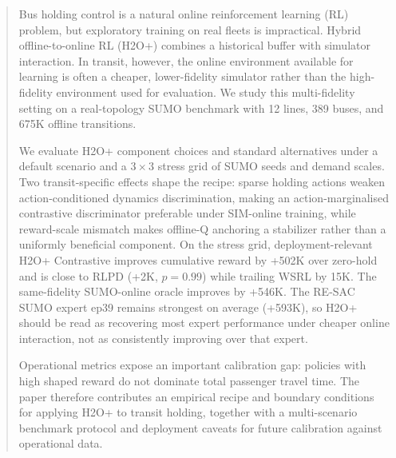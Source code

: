 \begin{abstract}
Bus holding control is a natural online reinforcement learning (RL) problem, but exploratory training on real fleets is impractical.
Hybrid offline-to-online RL (H2O+) combines a historical buffer with simulator interaction.
In transit, however, the online environment available for learning is often a cheaper, lower-fidelity simulator rather than the high-fidelity environment used for evaluation.
We study this multi-fidelity setting on a real-topology SUMO benchmark with 12 lines, 389 buses, and 675K offline transitions.

We evaluate H2O+ component choices and standard alternatives under a default scenario and a $3 \times 3$ stress grid of SUMO seeds and demand scales.
Two transit-specific effects shape the recipe: sparse holding actions weaken action-conditioned dynamics discrimination, making an action-marginalised contrastive discriminator preferable under SIM-online training, while reward-scale mismatch makes offline-Q anchoring a stabilizer rather than a uniformly beneficial component.
On the stress grid, deployment-relevant H2O+ Contrastive improves cumulative reward by +502K over zero-hold and is close to RLPD (+2K, $p = 0.99$) while trailing WSRL by 15K.
The same-fidelity SUMO-online oracle improves by +546K.
The RE-SAC SUMO expert ep39 remains strongest on average (+593K), so H2O+ should be read as recovering most expert performance under cheaper online interaction, not as consistently improving over that expert.

Operational metrics expose an important calibration gap: policies with high shaped reward do not dominate total passenger travel time.
The paper therefore contributes an empirical recipe and boundary conditions for applying H2O+ to transit holding, together with a multi-scenario benchmark protocol and deployment caveats for future calibration against operational data.
\end{abstract}
